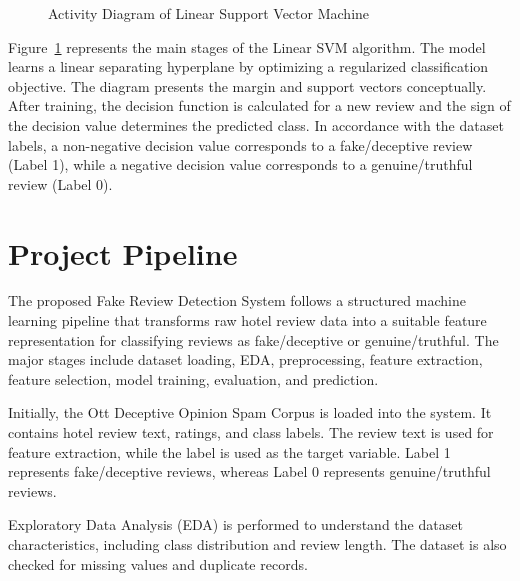 \documentclass[12pt,a4paper]{report}
\begin{document}
\begin{figure}[H]

\caption{Activity Diagram of Linear Support Vector Machine}
\label{fig:svm_activity}
\end{figure}

Figure~\ref{fig:svm_activity} represents the main stages of the Linear SVM algorithm. The model learns a linear separating hyperplane by optimizing a regularized classification objective. The diagram presents the margin and support vectors conceptually. After training, the decision function is calculated for a new review and the sign of the decision value determines the predicted class. In accordance with the dataset labels, a non-negative decision value corresponds to a fake/deceptive review (Label 1), while a negative decision value corresponds to a genuine/truthful review (Label 0).

\section{Project Pipeline}

The proposed Fake Review Detection System follows a structured machine learning pipeline that transforms raw hotel review data into a suitable feature representation for classifying reviews as fake/deceptive or genuine/truthful. The major stages include dataset loading, EDA, preprocessing, feature extraction, feature selection, model training, evaluation, and prediction.

Initially, the Ott Deceptive Opinion Spam Corpus is loaded into the system. It contains hotel review text, ratings, and class labels. The review text is used for feature extraction, while the label is used as the target variable. Label 1 represents fake/deceptive reviews, whereas Label 0 represents genuine/truthful reviews.

Exploratory Data Analysis (EDA) is performed to understand the dataset characteristics, including class distribution and review length. The dataset is also checked for missing values and duplicate records.
\end{document}
